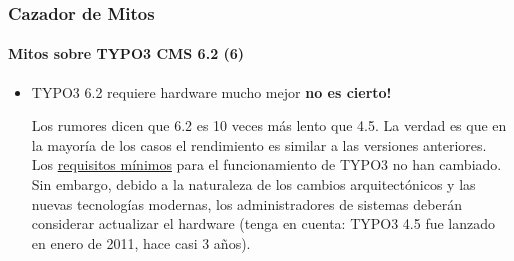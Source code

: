 \begin{frame}[fragile]
	\frametitle{Cazador de Mitos}
	\framesubtitle{Mitos sobre TYPO3 CMS 6.2 (6)}

	\begin{itemize}
		\item TYPO3 6.2 requiere hardware mucho mejor\newline
			\tabto{8.4cm}\color{red}\textbf{\textrightarrow no es cierto!}\color{black}

			\smaller
				Los rumores dicen que 6.2 es 10 veces más lento que 4.5. La verdad es que en la mayoría de los casos el rendimiento es similar a las versiones anteriores. Los \href{http://typo3.org/about/typo3-the-cms/system-requirements/}{requisitos mínimos} para el funcionamiento de TYPO3 no han cambiado. Sin embargo, debido a la naturaleza de los cambios arquitectónicos y las nuevas tecnologías modernas, los administradores de sistemas deberán considerar actualizar el hardware (tenga en cuenta: TYPO3 4.5 fue lanzado en enero de 2011, hace casi 3 años).
	\end{itemize}

\end{frame}


